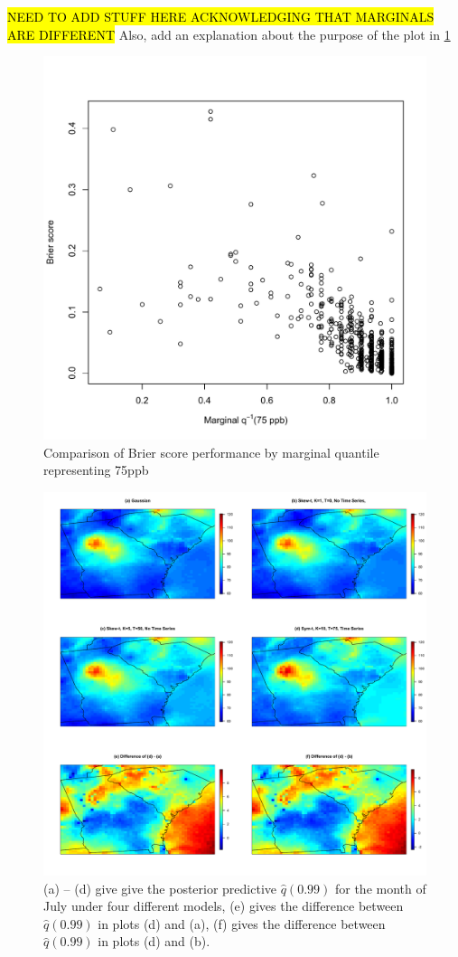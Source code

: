 \documentclass[11pt]{article}
\begin{document}
\hl{NEED TO ADD STUFF HERE ACKNOWLEDGING THAT MARGINALS ARE DIFFERENT}
Also, add an explanation about the purpose of the plot in \ref{fig:bs-marginal}
\begin{figure}
  \centering
  \includegraphics[width=0.5\linewidth]{plots/bs-ozone-marginal.pdf}
  \caption{Comparison of Brier score performance by marginal quantile representing 75ppb}
  \label{fig:bs-marginal}
\end{figure}


\begin{figure}
  \includegraphics[width=\linewidth]{plots/q99-ozone.pdf}
  \caption{(a) -- (d) give give the posterior predictive $\widehat{q}(0.99)$ for the month of July under four different models, (e) gives the difference between $\widehat{q}(0.99)$ in plots (d) and (a), (f) gives the difference between $\widehat{q}(0.99)$ in plots (d) and (b).}
  \label{fig:ozoneq99}
\end{figure}
\end{document}
